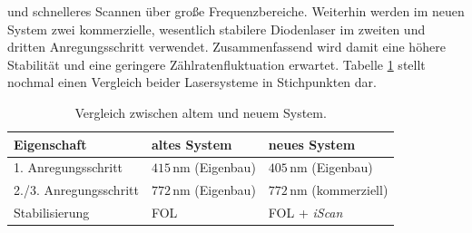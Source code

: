 und schnelleres Scannen über große Frequenzbereiche. Weiterhin werden im neuen
System zwei kommerzielle, wesentlich stabilere Diodenlaser im zweiten und
dritten Anregungsschritt verwendet. Zusammenfassend wird damit eine höhere
Stabilität und eine geringere Zählratenfluktuation erwartet. Tabelle
\ref{tab:vergleich_alt_neu} stellt nochmal einen Vergleich beider Lasersysteme
in Stichpunkten dar.
\begin{table}
	\begin{tabular}{p{}|p{}p{}}
		\toprule
		Eigenschaft & altes System & neues System\\
		\midrule[1px]
		\hline
		1. Anregungsschritt & $415\,$nm (Eigenbau) & $405\,$nm (Eigenbau)\\
		2./3. Anregungsschritt & $772\,$nm (Eigenbau) & $772\,$nm (kommerziell)\\
		Stabilisierung & FOL & FOL +
		\textit{iScan}\\
		\bottomrule[1px]
	\end{tabular}
	\caption[Vergleich von altem und
	neuem Lasersystem]{Vergleich zwischen altem und neuem System.}
	\label{tab:vergleich_alt_neu}
\end{table}
